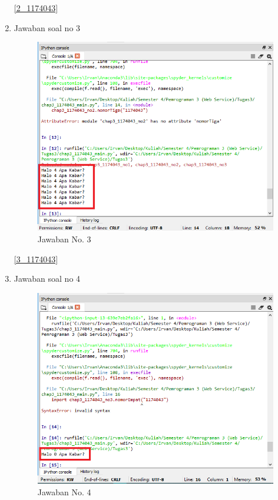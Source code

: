 \begin{enumerate}
				\ref{2_1174043}
			
			\item Jawaban soal no 3
				
				
				\begin{figure} [ht]
					\centerline{\includegraphics[width=1\textwidth]{figures/chapter3/3_1174043.png}}
					\caption{Jawaban No. 3}
					\label{3}
				\end{figure}

				\ref{3_1174043}
				
			\item Jawaban soal no 4
				
				
				\begin{figure} [ht]
					\centerline{\includegraphics[width=1\textwidth]{figures/chapter3/4_1174043.png}}
					\caption{Jawaban No. 4}
					\label{4}
				\end{figure}


\end{enumerate}
